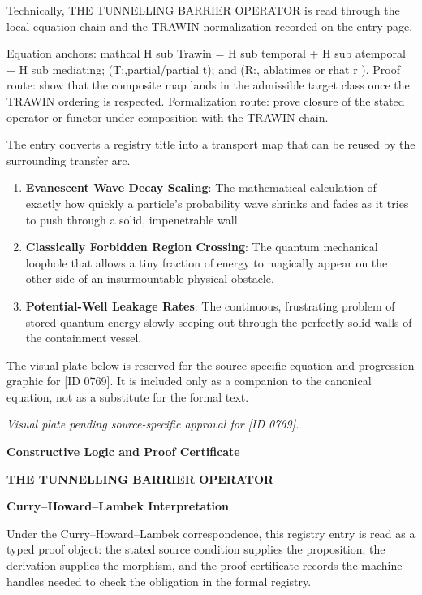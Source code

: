 Technically, THE TUNNELLING BARRIER OPERATOR is read through the local equation chain and the TRAWIN normalization recorded on the entry page.

Equation anchors: mathcal H sub Trawin = H sub temporal + H sub atemporal + H sub mediating; (T:,partial/partial t); and (R:, ablatimes or rhat r ). Proof route: show that the composite map lands in the admissible target class once the TRAWIN ordering is respected. Formalization route: prove closure of the stated operator or functor under composition with the TRAWIN chain.

The entry converts a registry title into a transport map that can be reused by the surrounding transfer arc.
\endgroup

\begin{enumerate}[leftmargin=1.6em,itemsep=6pt,topsep=4pt]
\item \textbf{Evanescent Wave Decay Scaling}: The mathematical calculation of exactly how quickly a particle's probability wave shrinks and fades as it tries to push through a solid, impenetrable wall.
\item \textbf{Classically Forbidden Region Crossing}: The quantum mechanical loophole that allows a tiny fraction of energy to magically appear on the other side of an insurmountable physical obstacle.
\item \textbf{Potential-Well Leakage Rates}: The continuous, frustrating problem of stored quantum energy slowly seeping out through the perfectly solid walls of the containment vessel.
\end{enumerate}

\begingroup\footnotesize\sloppy
The visual plate below is reserved for the source-specific equation and progression graphic for [ID 0769]. It is included only as a companion to the canonical equation, not as a substitute for the formal text.
\par\endgroup
\begingroup\footnotesize\itshape
Visual plate pending source-specific approval for [ID 0769].
\par\endgroup

\clearpage
\begingroup\tzpsupportsetup
\noindent\textbf{\fontsize{10.8pt}{12.8pt}\selectfont [ID 0769] Constructive Logic and Proof Certificate}\par
\noindent\textbf{\fontsize{10pt}{12pt}\selectfont THE TUNNELLING BARRIER OPERATOR}\par
\vspace{0.45em}
\begingroup
\footnotesize
\setlength{\parskip}{0.22em}
\setlength{\parindent}{0pt}
\noindent\textbf{Curry--Howard--Lambek Interpretation}\par
Under the Curry--Howard--Lambek correspondence, this registry entry is read as a typed proof
object: the stated source condition supplies the proposition, the derivation supplies the
morphism, and the proof certificate records the machine handles needed to check the obligation
in the formal registry.

